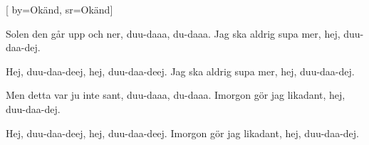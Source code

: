 


[ 	%
	by={Okänd},	%
	sr={Okänd}]	%
	
\beginverse*		%
Solen den går upp och ner,
duu-daaa, du-daaa.
Jag ska aldrig supa mer,
hej, duu-daa-dej.

Hej, duu-daa-deej,
hej, duu-daa-deej.
Jag ska aldrig supa mer,
hej, duu-daa-dej.
\endverse	

\beginverse*		%
Men detta var ju inte sant,
duu-daaa, du-daaa.
Imorgon gör jag likadant,
hej, duu-daa-dej.

Hej, duu-daa-deej,
hej, duu-daa-deej.
Imorgon gör jag likadant,
hej, duu-daa-dej.
\endverse
\endsong			%

